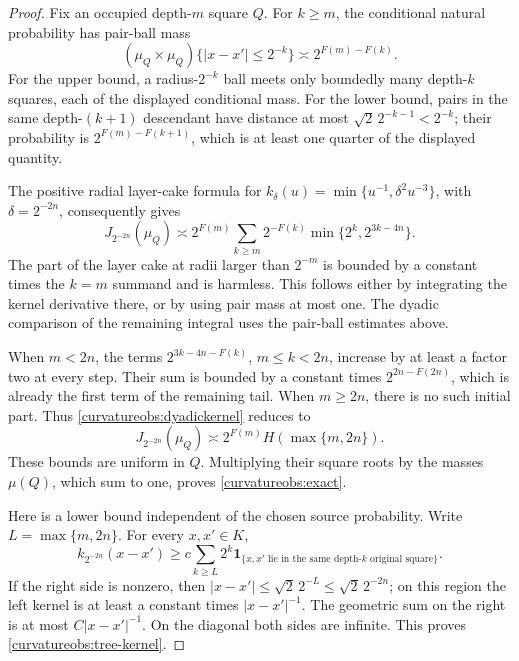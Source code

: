 \begin{proof}
Fix an occupied depth-\(m\) square \(Q\). For \(k\ge m\), the
conditional natural probability has pair-ball mass
\[
 (\mu_Q\times\mu_Q)\{|x-x'|\le2^{-k}\}
 \asymp 2^{F(m)-F(k)}.
\]
For the upper bound, a radius-\(2^{-k}\) ball meets only boundedly
many depth-\(k\) squares, each of the displayed conditional mass.
For the lower bound, pairs in the same depth-\((k+1)\) descendant
have distance at most \(\sqrt2\,2^{-k-1}<2^{-k}\); their probability
is \(2^{F(m)-F(k+1)}\), which is at least one quarter of the
displayed quantity.

The positive radial layer-cake formula for
\(k_\delta(u)=\min\{u^{-1},\delta^2u^{-3}\}\), with
\(\delta=2^{-2n}\), consequently gives
\begin{equation}\label{curvatureobs:dyadickernel}
 J_{2^{-2n}}(\mu_Q)
 \asymp
 2^{F(m)}
 \sum_{k\ge m}2^{-F(k)}
              \min\{2^k,2^{3k-4n}\}.
\end{equation}
The part of the layer cake at radii larger than \(2^{-m}\) is
bounded by a constant times the \(k=m\) summand and is harmless.
This follows either by integrating the kernel derivative there, or
by using pair mass at most one. The dyadic comparison of the
remaining integral uses the pair-ball estimates above.

When \(m<2n\), the terms \(2^{3k-4n-F(k)}\), \(m\le k<2n\),
increase by at least a factor two at every step. Their sum is bounded
by a constant times \(2^{2n-F(2n)}\), which is already the first
term of the remaining tail. When \(m\ge2n\), there is no such
initial part. Thus \eqref{curvatureobs:dyadickernel} reduces to
\[
 J_{2^{-2n}}(\mu_Q)
 \asymp 2^{F(m)}H(\max\{m,2n\}).
\]
These bounds are uniform in \(Q\). Multiplying their square roots
by the masses \(\mu(Q)\), which sum to one, proves
\eqref{curvatureobs:exact}.

Here is a lower bound independent of the chosen source probability.
Write \(L=\max\{m,2n\}\). For every \(x,x'\in K\),
\begin{equation}\label{curvatureobs:tree-kernel}
 k_{2^{-2n}}(x-x')
 \ge c\sum_{k\ge L}2^k
       \mathbf1_{\{x,x'\text{ lie in the same depth-}k
                              \text{ original square}\}}.
\end{equation}
If the right side is nonzero, then
\(|x-x'|\le\sqrt2\,2^{-L}\le\sqrt2\,2^{-2n}\);
on this region the left kernel is at least a constant times
\(|x-x'|^{-1}\). The geometric sum on the right is at most
\(C|x-x'|^{-1}\). On the diagonal both sides are infinite.
This proves \eqref{curvatureobs:tree-kernel}.


\end{proof}
